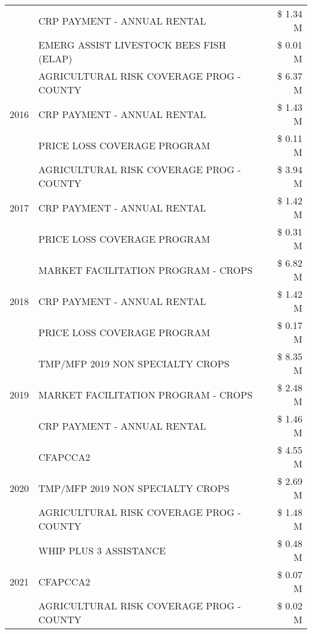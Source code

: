 \begin{tabular}{llr}
 & CRP PAYMENT - ANNUAL RENTAL & \$ 1.34 M \\
 & EMERG ASSIST LIVESTOCK BEES FISH (ELAP) & \$ 0.01 M \\
\cline{1-3}
\multirow[t]{3}{*}{2016} & AGRICULTURAL RISK COVERAGE PROG - COUNTY & \$ 6.37 M \\
 & CRP PAYMENT - ANNUAL RENTAL & \$ 1.43 M \\
 & PRICE LOSS COVERAGE PROGRAM & \$ 0.11 M \\
\cline{1-3}
\multirow[t]{3}{*}{2017} & AGRICULTURAL RISK COVERAGE PROG - COUNTY & \$ 3.94 M \\
 & CRP PAYMENT - ANNUAL RENTAL & \$ 1.42 M \\
 & PRICE LOSS COVERAGE PROGRAM & \$ 0.31 M \\
\cline{1-3}
\multirow[t]{3}{*}{2018} & MARKET FACILITATION PROGRAM - CROPS & \$ 6.82 M \\
 & CRP PAYMENT - ANNUAL RENTAL & \$ 1.42 M \\
 & PRICE LOSS COVERAGE PROGRAM & \$ 0.17 M \\
\cline{1-3}
\multirow[t]{3}{*}{2019} & TMP/MFP 2019 NON SPECIALTY CROPS & \$ 8.35 M \\
 & MARKET FACILITATION PROGRAM - CROPS & \$ 2.48 M \\
 & CRP PAYMENT - ANNUAL RENTAL & \$ 1.46 M \\
\cline{1-3}
\multirow[t]{3}{*}{2020} & CFAPCCA2 & \$ 4.55 M \\
 & TMP/MFP 2019 NON SPECIALTY CROPS & \$ 2.69 M \\
 & AGRICULTURAL RISK COVERAGE PROG - COUNTY & \$ 1.48 M \\
\cline{1-3}
\multirow[t]{3}{*}{2021} & WHIP PLUS 3 ASSISTANCE & \$ 0.48 M \\
 & CFAPCCA2 & \$ 0.07 M \\
 & AGRICULTURAL RISK COVERAGE PROG - COUNTY & \$ 0.02 M \\
\cline{1-3}
\bottomrule
\end{tabular}
